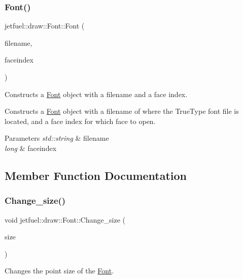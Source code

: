 \subsubsection{\texorpdfstring{Font()}{Font()}\hspace{0.1cm}{\footnotesize\ttfamily [3/3]}}
{\footnotesize\ttfamily jetfuel\+::draw\+::\+Font\+::\+Font (\begin{DoxyParamCaption}\item[{const std\+::string}]{filename,  }\item[{const long}]{faceindex }\end{DoxyParamCaption})}



Constructs a \hyperlink{classjetfuel_1_1draw_1_1Font}{Font} object with a filename and a face index. 

Constructs a \hyperlink{classjetfuel_1_1draw_1_1Font}{Font} object with a filename of where the True\+Type font file is located, and a face index for which face to open.


\begin{DoxyParams}{Parameters}
{\em std\+::string} & filename \\
\hline
{\em long} & faceindex \\
\hline
\end{DoxyParams}


\subsection{Member Function Documentation}
\mbox{\label{classjetfuel_1_1draw_1_1Font_a2a99e3273204f9dca27017c568f1eefe}} 
\subsubsection{\texorpdfstring{Change\+\_\+size()}{Change\_size()}}
{\footnotesize\ttfamily void jetfuel\+::draw\+::\+Font\+::\+Change\+\_\+size (\begin{DoxyParamCaption}\item[{const unsigned int}]{size }\end{DoxyParamCaption})}



Changes the point size of the \hyperlink{classjetfuel_1_1draw_1_1Font}{Font}. 

